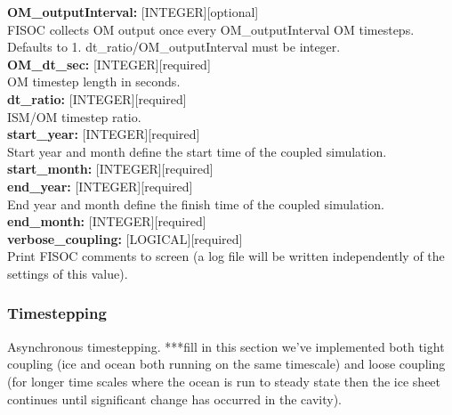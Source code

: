 \documentclass[12pt]{article}
\begin{document}
\begin{flushleft}
\textbf{OM\_outputInterval:} [INTEGER][optional]                           \\
FISOC collects OM output once every OM\_outputInterval OM timesteps. 
Defaults to 1.  dt\_ratio/OM\_outputInterval must be integer.              \\
\vspace{6pt}
\textbf{OM\_dt\_sec:}         [INTEGER][required]                          \\
OM timestep length in seconds.                                             \\
\vspace{6pt}
\textbf{dt\_ratio:}          [INTEGER][required]                           \\
ISM/OM timestep ratio.                                                     \\
\vspace{6pt}
\textbf{start\_year:}        [INTEGER][required]                           \\
Start year and month define the start time of the coupled simulation.      \\
\vspace{6pt}
\textbf{start\_month:}       [INTEGER][required]                           \\
\vspace{6pt}
\textbf{end\_year:}          [INTEGER][required]                           \\
End year and month define the finish time of the coupled simulation.       \\
\vspace{6pt}
\textbf{end\_month:}         [INTEGER][required]                           \\
\vspace{6pt}
\textbf{verbose\_coupling:}  [LOGICAL][required]                           \\
Print FISOC comments to screen (a log file will be written independently of the settings of this value).\\
\end{flushleft}

\subsubsection{Timestepping}
Asynchronous timestepping.
***fill in this section we've implemented both tight coupling (ice and ocean both running 
on the same timescale) and loose coupling (for longer time scales where the ocean is run 
to steady state then the ice sheet continues until significant change has occurred in the cavity).
\end{document}
